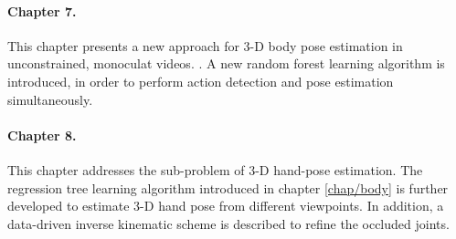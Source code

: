 \paragraph{Chapter 7.} 
This chapter presents a new approach for 3-D body pose estimation in unconstrained, monoculat videos. .   
A new random forest learning algorithm is introduced, in order to perform action detection and pose estimation simultaneously. 

\paragraph{Chapter 8.} 
This chapter addresses the sub-problem of 3-D hand-pose estimation. 
The regression tree learning algorithm introduced in chapter \ref{chap/body} is further developed to estimate 3-D hand pose from different viewpoints. 
In addition, a data-driven inverse kinematic scheme is described to refine the occluded joints.

